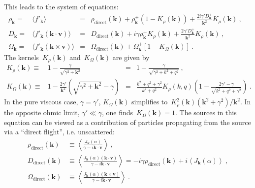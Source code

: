 \documentclass[preprint,aps,eqsecnum]{revtex4-1}
\newcommand{\fplus}[1]{{#1}^{+}}
\newcommand{\dct}[1]{{#1}_\mathrm{direct}}
\begin{document}
This leads to the system of equations:
\begin{align}
  \rho_{\bm k} ={}& \langle f'_{\bm k} \rangle
     &={}&\dct{\rho}({\bm k})
  + \fplus{\rho}_{\bm k} (1 - K_\rho({\bm k})) + \frac{2 i \gamma'
    \fplus{D}_{\bm k}}{{\bm k}^2} K_\rho({\bm k})
  \ ,&
  \label{eq:wh-rho}
  \\
  D_{\bm k} ={}& \langle f'_{\bm k} ({\bm k} \cdot {\bm v}) \rangle
  &={}&\dct{D}({\bm k}) + i \gamma \fplus{\rho}_{\bm k} K_\rho({\bm k})
  + \frac{2\gamma' \fplus{D}_{\bm k}}{{\bm k}^2} K_\rho({\bm k})\ ,&
  \label{eq:wh-D}
  \\
  \Omega_{\bm k} ={}&  \langle f'_{\bm k} ({\bm k} \times {\bm v}) \rangle
  &={}&  \dct{\Omega} ({\bm k})
  + \fplus{\Omega}_{\bm k} \left[1 - K_\Omega({\bm k})\right]
  \ .&
  \label{eq:wh-Omega}
\end{align}
The kernels~$K_\rho({\bm k})$ and~$K_\Omega({\bm k})$ are given by
\begin{align}
  \label{eq:K-rho-def}
   K_\rho({\bm k}) \equiv{}& 1 - \frac{\gamma}{\sqrt{\gamma^2 + {\bm k}^2}}
   &={}& 1 - \frac{\gamma}{\sqrt{\gamma^2 + k^2 + q^2}}\ ,
\\
\label{eq:K-omega-def}
  K_\Omega({\bm k}) \equiv{}&
  1 - \frac{2\gamma'}{{\bm k}^2}\left(\sqrt{\gamma^2 + {\bm k}^2} - \gamma\right)
  &={}& \frac{k^2 + q^2 + \gamma^2}{k^2 + q^2} K_\rho(k, q)
  \left(1 - \frac{2\gamma' - \gamma}{\sqrt{k^2 + q^2 + \gamma^2}}\right)      
  \ .
\end{align}
In the pure viscous case, $\gamma = \gamma'$,
$K_\Omega({\bm k})$ simplifies
to~$K_\rho^2({\bm k}) ({\bm k}^2 + \gamma^2)/{\bm k}^2$.
In the opposite ohmic limit, $\gamma' \ll \gamma$, one
finds~$K_\Omega({\bm k}) = 1$.
The sources in this equation can be viewed as a contribution of particles
propagating from the source via a ``direct flight'', i.e. unscattered:
\begin{align}
  \dct{\rho}({\bm k}) &\equiv
  \left\langle
      \frac{J_{\bm k}(\alpha)}{ \gamma - i {\bm k} \cdot {\bm v}}
  \right\rangle
  \ ,
  \\
  \dct{D}({\bm k}) &\equiv
  \left\langle
       \frac{J_{\bm k}(\alpha) ({\bm k} \cdot {\bm v})}{\gamma
                                             - i {\bm k} \cdot {\bm v}}
  \right\rangle
  = -i \gamma \dct{\rho}({\bm k})
  + i \left\langle J_{\bm k}(\alpha) \right\rangle
  \ ,
  \\
  \dct{\Omega}({\bm k}) &\equiv
  \left\langle
       \frac{J_{\bm k}(\alpha) ({\bm k} \times {\bm v})}{\gamma
                                            - i {\bm k} \cdot {\bm v}}
   \right\rangle
  \ .
\end{align}
\end{document}
